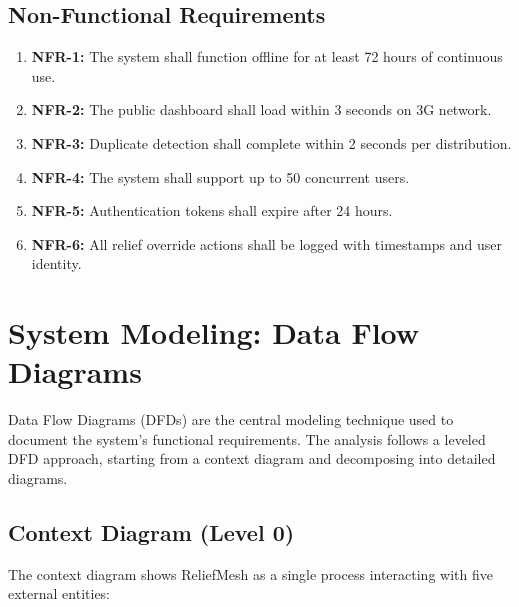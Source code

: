 \subsection{Non-Functional Requirements}
\begin{enumerate}
    \item \textbf{NFR-1:} The system shall function offline for at least 72 hours of continuous use.
    \item \textbf{NFR-2:} The public dashboard shall load within 3 seconds on 3G network.
    \item \textbf{NFR-3:} Duplicate detection shall complete within 2 seconds per distribution.
    \item \textbf{NFR-4:} The system shall support up to 50 concurrent users.
    \item \textbf{NFR-5:} Authentication tokens shall expire after 24 hours.
    \item \textbf{NFR-6:} All relief override actions shall be logged with timestamps and user identity.
\end{enumerate}

\section{System Modeling: Data Flow Diagrams}

Data Flow Diagrams (DFDs) are the central modeling technique used to document the system's functional requirements. The analysis follows a leveled DFD approach, starting from a context diagram and decomposing into detailed diagrams.

\subsection{Context Diagram (Level 0)}

The context diagram shows ReliefMesh as a single process interacting with five external entities:

